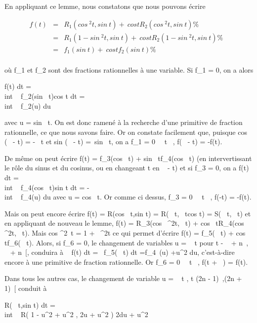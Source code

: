 \documentclass[]{article}
\begin{document}
En appliquant ce lemme, nous constatons que nous pouvons écrire

\begin{align*} f(t)& =&
R_1(cos~
^2t,sin~ t) +\
cos tR_ 2(cos~
^2t,sin~ t) \%&
\\ & =& R_1(1
- sin~
^2t,sin~ t) +\
cos t R_ 2(1 - sin~
^2t,sin~ t)\%&
\\ & =&
f_1(sin~ t) +\
cos t f_2(sin~ t) \%&
\\ \end{align*}

où f_1 et f_2 sont des fractions rationnelles à une
variable. Si f_1 = 0, on a alors

\int  f(t) dt =\\int ~
f_2(sin~
t)cos t dt =\\int ~
f_2(u) du

avec u = sin~ t. On est donc ramené à la
recherche d'une primitive de fraction rationnelle, ce que nous savons
faire. Or on constate facilement que, puisque
cos (\pi~ - t) = -\cos~ t
et sin (\pi~ - t) =\ sin~
t, on a f_1 = 0 \Leftrightarrow
\forall~~t \in \mathbb{R}~, f(\pi~ - t) = -f(t).

De même on peut écrire f(t) = f_3(cos~
t) + sin~
tf_4(cos~ t) (en intervertissant le
rôle du sinus et du cosinus, ou en changeant t en  \pi~
\over 2 - t) et si f_3 = 0, on a
\int  f(t) dt =\\int ~
f_4(cos~
t)sin t dt = -\\int ~
f_4(u) du avec u = cos~ t. Or comme ci
dessus, f_3 = 0 \Leftrightarrow
\forall~~t \in {}~, f(-t) = -f(t).

Mais on peut encore écrire f(t) = R(cos~
t,sin t) = R(\cos~
t,\mathrmtg~
tcos t) = S(\cos~
t,\mathrmtg~ t) et en
appliquant de nouveau le lemme, f(t) =
R_3(cos~
^2t,\mathrmtg~ t)
+ cos~
tR_4(cos~
^2t,\mathrmtg~ t).
Mais cos ^2~t = 1
+\mathrmtg~
^2t ce qui permet d'écrire f(t) =
f_5(\mathrmtg~ t)
+ cos~
tf_6(\mathrmtg~ t).
Alors, si f_6 = 0, le changement de variables u
= \mathrmtg~ t pour t \in{]}
- \pi~ \over 2 + n\pi~, \pi~  +
n\pi~{[}, conduira à \int ~ f(t) dt
=\int ~
f_5(\mathrmtg~ t)
dt =\int   f_4~(u) +u^2 du, c'est-à-dire encore à une primitive de fraction
rationnelle. Or f_6 = 0 \Leftrightarrow
\forall~~t \in \mathbb{R}~, f(t + \pi~) = f(t).

Dans tous les autres cas, le changement de variable u
= \mathrmtg~  t
 , t \in{]}(2n - 1)\pi~,(2n + 1)\pi~{[} conduit à

\int  R(\cos~
t,sin t) dt =\\int ~ R(
1 - u^2  + u^2 , 2u
 + u^2 ) 2du \over 1
+ u^2
\end{document}
